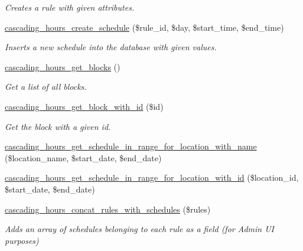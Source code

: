 \begin{DoxyCompactItemize}
\begin{DoxyCompactList}\small\item\em Creates a rule with given attributes. \end{DoxyCompactList}\item 
\hyperlink{cascading__hours_8module_a1cdd4374fcd3c374d31fa8eb76f4c8b8_a1cdd4374fcd3c374d31fa8eb76f4c8b8}{cascading\+\_\+hours\+\_\+create\+\_\+schedule} (\$rule\+\_\+id, \$day, \$start\+\_\+time, \$end\+\_\+time)
\begin{DoxyCompactList}\small\item\em Inserts a new schedule into the database with given values. \end{DoxyCompactList}\item 
\hyperlink{cascading__hours_8module_a56f022b7b3f4d32a57ebbadfc5de07ce_a56f022b7b3f4d32a57ebbadfc5de07ce}{cascading\+\_\+hours\+\_\+get\+\_\+blocks} ()
\begin{DoxyCompactList}\small\item\em Get a list of all blocks. \end{DoxyCompactList}\item 
\hyperlink{cascading__hours_8module_aa5760649e1a1394320af51da8bca6ef9_aa5760649e1a1394320af51da8bca6ef9}{cascading\+\_\+hours\+\_\+get\+\_\+block\+\_\+with\+\_\+id} (\$id)
\begin{DoxyCompactList}\small\item\em Get the block with a given id. \end{DoxyCompactList}\item 
\hyperlink{cascading__hours_8module_abd309525f192683563a6383c35a3fbdd_abd309525f192683563a6383c35a3fbdd}{cascading\+\_\+hours\+\_\+get\+\_\+schedule\+\_\+in\+\_\+range\+\_\+for\+\_\+location\+\_\+with\+\_\+name} (\$location\+\_\+name, \$start\+\_\+date, \$end\+\_\+date)
\item 
\hyperlink{cascading__hours_8module_ada7d4e90d064a9366c4f151a7c43b729_ada7d4e90d064a9366c4f151a7c43b729}{cascading\+\_\+hours\+\_\+get\+\_\+schedule\+\_\+in\+\_\+range\+\_\+for\+\_\+location\+\_\+with\+\_\+id} (\$location\+\_\+id, \$start\+\_\+date, \$end\+\_\+date)
\item 
\hyperlink{cascading__hours_8module_a62c7e94585316cfd40512535a11a1910_a62c7e94585316cfd40512535a11a1910}{cascading\+\_\+hours\+\_\+concat\+\_\+rules\+\_\+with\+\_\+schedules} (\$rules)
\begin{DoxyCompactList}\small\item\em Adds an array of schedules belonging to each rule as a field (for Admin UI purposes) \end{DoxyCompactList}\item 

\end{DoxyCompactItemize}
